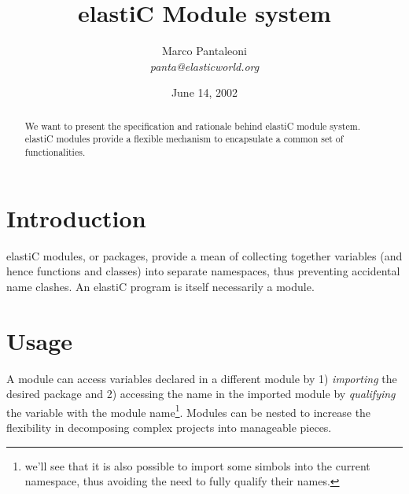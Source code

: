 \documentclass[makeidx,10pt,titlepage]{article}
\begin{document}
\title{elastiC Module system}
\author{
Marco Pantaleoni\\
{\sl panta@elasticworld.org}}
\date{June 14, 2002}
\maketitle

\begin{abstract}
We want to present the specification and rationale behind elastiC
module system. elastiC modules provide a flexible mechanism to
encapsulate a common set of functionalities.
\end{abstract}

\section{Introduction}

elastiC modules, or packages, provide a mean of collecting together
variables (and hence functions and classes) into separate namespaces,
thus preventing accidental name clashes.
An elastiC program is itself necessarily a module.

\section{Usage}
 A module can access variables declared in a different module by 1)
 {\sl importing} the desired package and 2) accessing
the name in the imported module by {\sl qualifying} the variable with
the module name\footnote{we'll see that it is also possible to import
  some simbols into the current namespace, thus avoiding the need to
  fully qualify their names.}.
Modules can be nested to increase the flexibility in decomposing
complex projects into manageable pieces.
\end{document}
